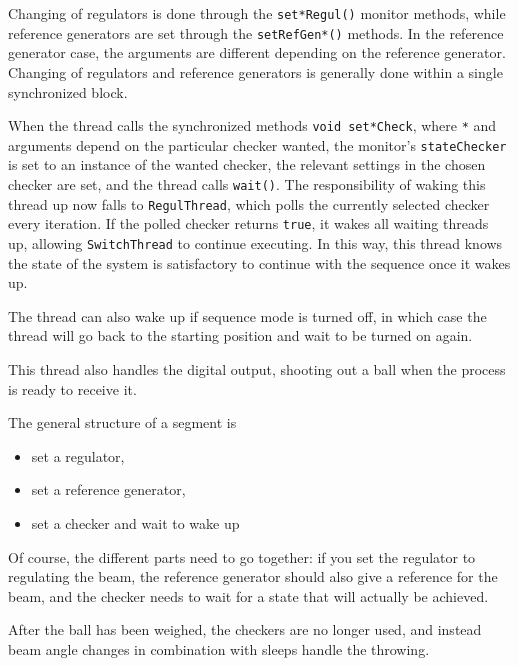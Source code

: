 Changing of regulators is done through the \texttt{set*Regul()} monitor methods, while reference generators are set through the \texttt{setRefGen*()} methods. 
In the reference generator case, the arguments are different depending on the reference generator. 
Changing of regulators and reference generators is generally done within a single synchronized block.

When the thread calls the synchronized methods \texttt{void set*Check}, where \texttt{*} and arguments depend on the particular checker wanted, the monitor's \texttt{stateChecker} is set to an instance of the wanted checker, the relevant settings in the chosen checker are set, and the thread calls \texttt{wait()}. 
The responsibility of waking this thread up now falls to \texttt{RegulThread}, which polls the currently selected checker every iteration. 
If the polled checker returns \texttt{true}, it wakes all waiting threads up, allowing \texttt{SwitchThread} to continue executing. 
In this way, this thread knows the state of the system is satisfactory to continue with the sequence once it wakes up.

The thread can also wake up if sequence mode is turned off, in which case the thread will go back to the starting position and wait to be turned on again.

This thread also handles the digital output, shooting out a ball when the process is ready to receive it.

The general structure of a segment is
\begin{itemize}
\item set a regulator,
\item set a reference generator,
\item set a checker and wait to wake up
\end{itemize}

Of course, the different parts need to go together: if you set the regulator to regulating the beam, 
the reference generator should also give a reference for the beam, 
and the checker needs to wait for a state that will actually be achieved.

After the ball has been weighed, the checkers are no longer used, and instead beam angle changes in combination with sleeps handle the throwing.
